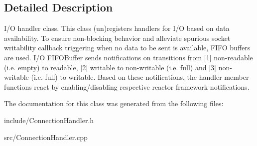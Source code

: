 \subsection{Detailed Description}
I/O handler class. This class (un)registers handlers for I/O based on data availability. To ensure non-\/blocking behavior and alleviate spurious socket writability callback triggering when no data to be sent is available, F\+I\+FO buffers are used. I/O F\+I\+F\+O\+Buffer sends notifications on transitions from \mbox{[}1\mbox{]} non-\/readable (i.\+e. empty) to readable, \mbox{[}2\mbox{]} writable to non-\/writable (i.\+e. full) and \mbox{[}3\mbox{]} non-\/writable (i.\+e. full) to writable. Based on these notifications, the handler member functions react by enabling/disabling respective reactor framework notifications. 

The documentation for this class was generated from the following files\+:\begin{DoxyCompactItemize}
\item 
include/Connection\+Handler.\+h\item 
src/Connection\+Handler.\+cpp\end{DoxyCompactItemize}
